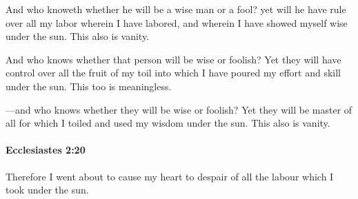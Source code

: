 			\begin{versebox}
					\item[BHS] 
					\item[LXX] 
					\item[ASV] And who knoweth whether he will be a wise man or a fool? yet will he have rule over all my labor wherein I have labored, and wherein I have showed myself wise under the sun. This also is vanity.
					\item[NIV] And who knows whether that person will be wise or foolish? Yet they will have control over all the fruit of my toil into which I have poured my effort and skill under the sun. This too is meaningless.
					\item[NRSV] —and who knows whether they will be wise or foolish? Yet they will be master of all for which I toiled and used my wisdom under the sun. This also is vanity.
			\end{versebox}

		\paragraph{Ecclesiastes 2:20} %
			\label{ECCLESIASTES-2-20}

			Therefore I went about to cause my heart to despair of all the labour which I took under the sun.

